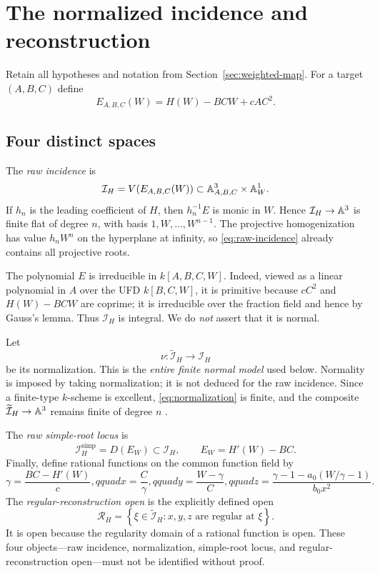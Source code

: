 \section{The normalized incidence and reconstruction}\label{sec:weighted-incidence}

Retain all hypotheses and notation from Section~\ref{sec:weighted-map}.  For
a target $(A,B,C)$ define
\begin{equation}\label{eq:weighted-pencil}
 E_{A,B,C}(W)=H(W)-BCW+cAC^2.
\end{equation}

\subsection{Four distinct spaces}

The \emph{raw incidence} is
\begin{equation}\label{eq:raw-incidence}
 \mathcal I_H=V(E_{A,B,C}(W))
 \subset\mathbb A^3_{A,B,C}\times\mathbb A^1_W.
\end{equation}
If $h_n$ is the leading coefficient of $H$, then $h_n^{-1}E$ is monic in
$W$.  Hence $\mathcal I_H\to\mathbb A^3$ is finite flat of degree $n$, with basis
$1,W,\ldots,W^{n-1}$.  The projective homogenization has value $h_nW^n$ on
the hyperplane at infinity, so \eqref{eq:raw-incidence} already contains all
projective roots.

The polynomial $E$ is irreducible in $k[A,B,C,W]$.  Indeed, viewed as a
linear polynomial in $A$ over the UFD $k[B,C,W]$, it is primitive because
$cC^2$ and $H(W)-BCW$ are coprime; it is irreducible over the fraction field
and hence by Gauss's lemma.  Thus $\mathcal I_H$ is integral.  We do
\emph{not} assert that it is normal.

Let
\begin{equation}\label{eq:normalization}
 \nu:\widetilde{\mathcal I}_H\longrightarrow\mathcal I_H
\end{equation}
be its normalization.  This is the \emph{entire finite normal model} used
below.  Normality is imposed by taking normalization; it is not deduced for
the raw incidence.  Since a finite-type $k$-scheme is excellent,
\eqref{eq:normalization} is finite, and the composite
$\widetilde{\mathcal I}_H\to\mathbb A^3$ remains finite of degree $n$
\cite{stacks-normalization}.

The \emph{raw simple-root locus} is
\[
 \mathcal I_H^{\mathrm{simp}}=D(E_W)\subset\mathcal I_H,
 \qquad E_W=H'(W)-BC.
\]
Finally, define rational functions on the common function field by
\begin{equation}\label{eq:weighted-reconstruction}
 \gamma=\frac{BC-H'(W)}c,qquad
 x=\frac C\gamma,qquad
 y=\frac{W-\gamma}{C},qquad
 z=\frac{\gamma-1-a_0(W/\gamma-1)}{b_0x^2}.
\end{equation}
The \emph{regular-reconstruction open} is the explicitly defined open
\begin{equation}\label{eq:RH}
 \mathcal R_H=\left\{\xi\in\widetilde{\mathcal I}_H:
 x,y,z\text{ are regular at }\xi\right\}.
\end{equation}
It is open because the regularity domain of a rational function is open.
These four objects---raw incidence, normalization, simple-root locus, and
regular-reconstruction open---must not be identified without proof.

